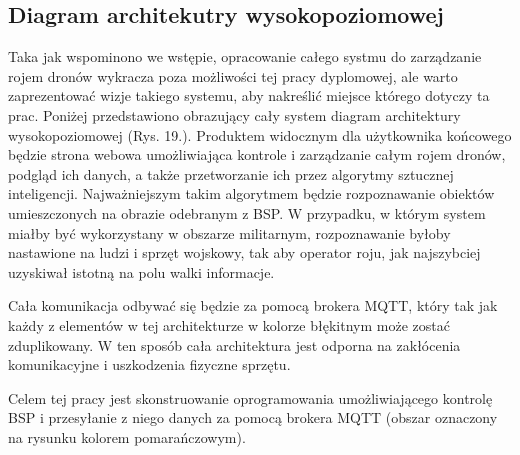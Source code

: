 \newpage
\subsection{Diagram architekutry wysokopoziomowej}

Taka jak wspominono we wstępie, opracowanie całego systmu do zarządzanie rojem dronów wykracza poza możliwości tej pracy dyplomowej, ale warto zaprezentować wizje takiego systemu, aby nakreślić miejsce którego dotyczy ta prac. Poniżej przedstawiono obrazujący cały system diagram architektury wysokopoziomowej (Rys. 19.).  Produktem widocznym dla użytkownika końcowego będzie strona webowa umożliwiająca kontrole i zarządzanie całym rojem dronów, podgląd ich danych, a także przetworzanie ich przez algorytmy sztucznej inteligencji. Najważniejszym takim algorytmem będzie rozpoznawanie obiektów umieszczonych na obrazie odebranym z BSP. W przypadku, w którym system miałby być wykorzystany w obszarze militarnym, rozpoznawanie byłoby nastawione na ludzi i sprzęt wojskowy, tak aby operator roju, jak najszybciej uzyskiwał istotną na polu walki informacje.

Cała komunikacja odbywać się będzie za pomocą brokera MQTT, który tak jak każdy z elementów w tej architekturze w kolorze błękitnym może zostać zduplikowany. W ten sposób cała architektura jest odporna na zakłócenia komunikacyjne i uszkodzenia fizyczne sprzętu.

Celem tej pracy jest skonstruowanie oprogramowania umożliwiającego kontrolę BSP i przesyłanie z niego danych za pomocą brokera MQTT (obszar oznaczony na rysunku kolorem pomarańczowym).

\newpage

